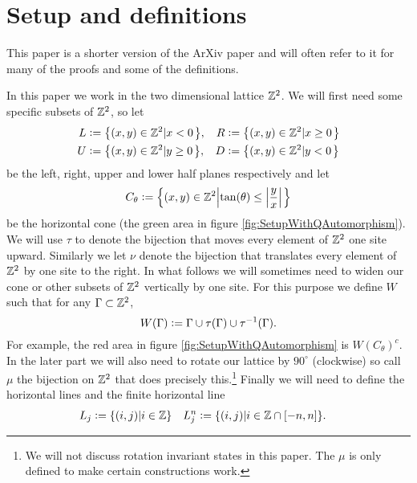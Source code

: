 \documentclass[11pt,a4paper,twoside]{article}
\numberwithin{equation}{section}
\begin{document}
\section{Setup and definitions}\label{sec:Setup}
\begin{remark}
	This paper is a shorter version of the ArXiv paper \cite{jappens2023spt} and will often refer to it for many of the proofs and some of the definitions.
\end{remark}
In this paper we work in the two dimensional lattice $\mathbb Z^2$. We will first need some specific subsets of $\mathbb Z^2$, so let
\begin{align}
	L&\defeq \left\{(x,y)\in\ZZ^2\left|x<0\right.\right\},&R&\defeq \left\{(x,y)\in\ZZ^2\left|x\geq 0\right.\right\}\\
	U&\defeq \left\{(x,y)\in\ZZ^2\left|y\geq 0\right.\right\},&D&\defeq \left\{(x,y)\in\ZZ^2\left|y<0\right.\right\}
\end{align}
be the left, right, upper and lower half planes respectively and let
\begin{equation}
	C_\theta\defeq \left\{(x,y)\in\ZZ^2\left|\tan(\theta)\leq\abs{\frac{y}{x}}\right.\right\}
\end{equation}
be the horizontal cone (the green area in figure \ref{fig:SetupWithQAutomorphism}). We will use $\tau$ to denote the bijection that moves every element of $\mathbb Z^2$ one site upward. Similarly we let $\nu$ denote the bijection that translates every element of $\mathbb Z^2$ by one site to the right. In what follows we will sometimes need to widen our cone or other subsets of $\mathbb Z^2$ vertically by one site. For this purpose we define $W$ such that for any $\Gamma\subset\mathbb Z^2$,
\begin{equation}
	W(\Gamma)\vcentcolon= \Gamma\cup\tau(\Gamma)\cup\tau^{-1}(\Gamma).
\end{equation}
For example, the red area in figure \ref{fig:SetupWithQAutomorphism} is $W(C_\theta)^c$. In the later part we will also need to rotate our lattice by $90^\circ$ (clockwise) so call $\mu$ the bijection on $\mathbb Z^2$ that does precisely this.\footnote{We will not discuss rotation invariant states in this paper. The $\mu$ is only defined to make certain constructions work.} Finally we will need to define the horizontal lines and the finite horizontal line
\begin{align}
	L_j&\vcentcolon= \{(i,j)|i\in\mathbb Z\}&L_j^n&\vcentcolon= \{(i,j)|i\in\mathbb Z\cap[-n,n]\}.
\end{align}
\end{document}
